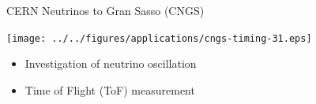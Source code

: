 \documentclass[compress,red]{beamer}
\begin{document}
\begin{frame}{CERN Neutrinos to Gran Sasso (CNGS)}

    \begin{center}
      \texttt{[image: ../../figures/applications/cngs-timing-31.eps]}
    \end{center}

    \begin{center}
      \begin{itemize}
	\item Investigation of neutrino oscillation
	\item Time of Flight (ToF) measurement
      \end{itemize}

    \end{center}


\end{frame}
% 
% 
% 
\end{document}
